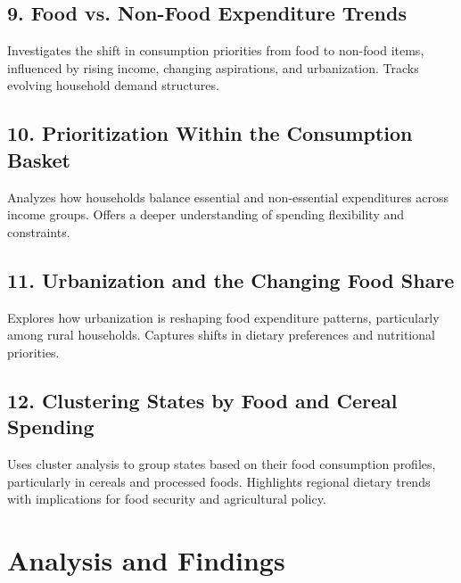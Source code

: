 \documentclass{article}
\begin{document}
\subsection*{9. Food vs. Non-Food Expenditure Trends}

Investigates the shift in consumption priorities from food to non-food items, influenced by rising income, changing aspirations, and urbanization. Tracks evolving household demand structures.

\subsection*{10. Prioritization Within the Consumption Basket}

Analyzes how households balance essential and non-essential expenditures across income groups. Offers a deeper understanding of spending flexibility and constraints.


\subsection*{11. Urbanization and the Changing Food Share}

Explores how urbanization is reshaping food expenditure patterns, particularly among rural households. Captures shifts in dietary preferences and nutritional priorities.

\subsection*{12. Clustering States by Food and Cereal Spending}

Uses cluster analysis to group states based on their food consumption profiles, particularly in cereals and processed foods. Highlights regional dietary trends with implications for food security and agricultural policy.

	
	\section{Analysis and Findings}
	
\end{document}
